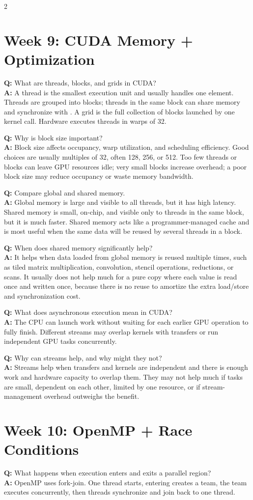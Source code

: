 \documentclass[9pt]{extarticle}
\newcommand{\code}[1]{\texttt{\detokenize{#1}}}
\newcommand{\qa}[2]{\textbf{Q:} #1\\\textbf{A:} #2\par\vspace{1pt}}
\begin{document}
\begin{multicols}{2}
\section{Week 9: CUDA Memory + Optimization}
\qa{What are threads, blocks, and grids in CUDA?}{A thread is the smallest execution unit and usually handles one element. Threads are grouped into blocks; threads in the same block can share \code{__shared__} memory and synchronize with \code{__syncthreads()}. A grid is the full collection of blocks launched by one kernel call. Hardware executes threads in warps of 32.}

\qa{Why is block size important?}{Block size affects occupancy, warp utilization, and scheduling efficiency. Good choices are usually multiples of 32, often 128, 256, or 512. Too few threads or blocks can leave GPU resources idle; very small blocks increase overhead; a poor block size may reduce occupancy or waste memory bandwidth.}

\qa{Compare global and shared memory.}{Global memory is large and visible to all threads, but it has high latency. Shared memory is small, on-chip, and visible only to threads in the same block, but it is much faster. Shared memory acts like a programmer-managed cache and is most useful when the same data will be reused by several threads in a block.}

\qa{When does shared memory significantly help?}{It helps when data loaded from global memory is reused multiple times, such as tiled matrix multiplication, convolution, stencil operations, reductions, or scans. It usually does not help much for a pure copy where each value is read once and written once, because there is no reuse to amortize the extra load/store and synchronization cost.}

\qa{What does asynchronous execution mean in CUDA?}{The CPU can launch work without waiting for each earlier GPU operation to fully finish. Different streams may overlap kernels with transfers or run independent GPU tasks concurrently.}

\qa{Why can streams help, and why might they not?}{Streams help when transfers and kernels are independent and there is enough work and hardware capacity to overlap them. They may not help much if tasks are small, dependent on each other, limited by one resource, or if stream-management overhead outweighs the benefit.}

\section{Week 10: OpenMP + Race Conditions}
\qa{What happens when execution enters and exits a parallel region?}{OpenMP uses fork-join. One thread starts, entering \code{\#pragma omp parallel} creates a team, the team executes concurrently, then threads synchronize and join back to one thread.}


\end{multicols}
\end{document}
